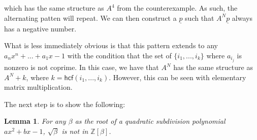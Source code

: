 \documentclass[
11pt, %
english, %
singlespacing, %
parskip, %
headsepline, %
]{amsart} %
\newtheorem{lemma}[theorem]{Lemma}
\theoremstyle{definition}
\begin{document}
which has the same structure as $A^4$ from the counterexample. As such, the alternating patten will repeat. We can then construct a $\underline{p}$ such that $A^N\underline{p}$ always has a negative number.
\par
What is less immediately obvious is that this pattern extends to any $a_n x^n + ... + a_1 x -1$ with the condition that the set of $\{i_1,...,i_k\}$ where $a_{i_j}$ is nonzero is not coprime. In this case, we have that $A^N$ has the same structure as $A^N+k$, where $k = \textsf{hcf}(i_1,...,i_k)$. However, this can be seen with elementary matrix multiplication.
\par
The next step is to show the following:

\begin{lemma}\label{rootexclude}
For any $\beta$ as the root of a quadratic subdivision polynomial $ax^2+bx-1$, $\sqrt{\beta}$ is not in $\mathbb{Z}[\beta]$.
\end{lemma}
\end{document}
